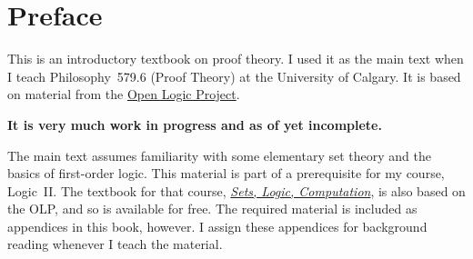 
\chapter{Preface}

This is an introductory textbook on proof theory. I used it as the
main text when I teach Philosophy~579.6 (Proof Theory) at the
University of Calgary. It is based on material from the
\href{https://openlogicproject.org}{Open Logic Project}.

\textbf{It is very much work in progress and as of yet incomplete.}

The main text assumes familiarity with some elementary set theory and
the basics of first-order logic. This material is part of a
prerequisite for my course, Logic~II. The textbook for that course,
\href{https://slc.openlogicproject.org}{\emph{Sets, Logic,
Computation}}, is also based on the OLP, and so is available for free.
The required material is included as appendices in this book,
however. I assign these appendices for background reading whenever I
teach the material.